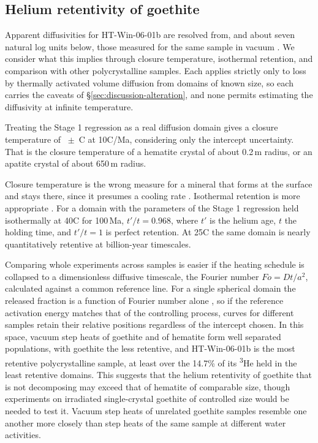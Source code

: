 \subsection{Helium retentivity of goethite}\label{sec:discussion-retentivity}

Apparent diffusivities for HT-Win-06-01b are resolved from, and about seven natural log units below, those measured for the same sample in vacuum \citep{monteiro2017,farley2024}. We consider what this implies through closure temperature, isothermal retention, and comparison with other polycrystalline samples. Each applies strictly only to loss by thermally activated volume diffusion from domains of known size, so each carries the caveats of \S\ref{sec:discussion-alteration}, and none permits estimating the diffusivity at infinite temperature.

Treating the Stage 1 regression as a real diffusion domain gives a closure temperature of \ChTwoTc\ $\pm$ \ChTwoTcErr\,\textdegree C at 10\textdegree C/Ma, considering only the intercept uncertainty. That is the closure temperature of a hematite crystal of about 0.2\,\textmu m radius, or an apatite crystal of about 650\,\textmu m radius.

Closure temperature is the wrong measure for a mineral that forms at the surface and stays there, since it presumes a cooling rate \citep{dodson1973}. Isothermal retention is more appropriate \citep{wolf1998}. For a domain with the parameters of the Stage 1 regression held isothermally at 40\textdegree C for 100\,Ma, $t'/t = 0.968$, where $t'$ is the helium age, $t$ the holding time, and $t'/t = 1$ is perfect retention. At 25\textdegree C the same domain is nearly quantitatively retentive at billion-year timescales.

Comparing whole experiments across samples is easier if the heating schedule is collapsed to a dimensionless diffusive timescale, the Fourier number $Fo = Dt/a^{2}$, calculated against a common reference line. For a single spherical domain the released fraction is a function of Fourier number alone \citep{crank1979,fechtigkalbitzer1966}, so if the reference activation energy matches that of the controlling process, curves for different samples retain their relative positions regardless of the intercept chosen. In this space, vacuum step heats of goethite and of hematite form well separated populations, with goethite the less retentive, and HT-Win-06-01b is the most retentive polycrystalline sample, at least over the 14.7\% of its \textsuperscript{3}He held in the least retentive domains. This suggests that the helium retentivity of goethite that is not decomposing may exceed that of hematite of comparable size, though experiments on irradiated single-crystal goethite of controlled size would be needed to test it. Vacuum step heats of unrelated goethite samples resemble one another more closely than step heats of the same sample at different water activities.

